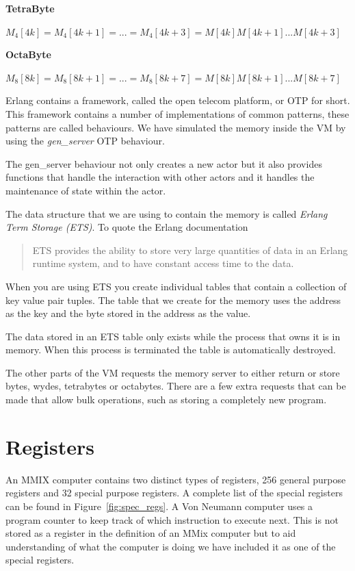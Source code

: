 \documentclass[a4paper,11pt]{report}
\begin{document}
\textbf{TetraByte}

\begin{math}
M_4[4k] = M_4[4k+1] = ... = M_4[4k+3] = M[4k]M[4k+1]...M[4k+3]
\end{math}

\textbf{OctaByte}

\begin{math}
M_8[8k] = M_8[8k+1] = ... = M_8[8k+7] = M[8k]M[8k+1]...M[8k+7]
\end{math}

Erlang contains a framework, called the open telecom platform, or OTP for short. This framework contains a number of implementations of common patterns, these patterns are called behaviours. We have simulated the memory inside the VM by using the \textit{gen\_server} OTP behaviour.

The gen\_server behaviour not only creates a new actor but it also provides functions that handle the interaction with other actors and it handles the maintenance of state within the actor.

The data structure that we are using to contain the memory is called \textit{Erlang Term Storage (ETS)}. To quote the Erlang documentation
\begin{quote}
ETS provides the ability to store very large quantities of data in an Erlang runtime system, and to have constant access time to the data.
\end{quote}

When you are using ETS you create individual tables that contain a collection of key value pair tuples. The table that we create for the memory uses the address as the key and the byte stored in the address as the value.

The data stored in an ETS table only exists while the process that owns it is in memory. When this process is terminated the table is automatically destroyed.

The other parts of the VM requests the memory server to either return or store bytes, wydes, tetrabytes or octabytes. There are a few extra requests that can be made that allow bulk operations, such as storing a completely new program.

\section{Registers}\label{registers}
An MMIX computer contains two distinct types of registers, 256 general purpose registers and 32 special purpose registers. A complete list of the special registers can be found in Figure~\ref{fig:spec_regs}. A Von Neumann computer uses a program counter to keep track of which instruction to execute next. This is not stored as a register in the definition of an MMix computer but to aid understanding of what the computer is doing we have included it as one of the special registers.
\end{document}
